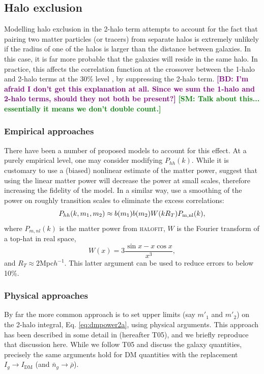 \documentclass[5p]{elsarticle}
\newcommand{\bd}[1]{\textcolor{purple}{\textbf{[BD: #1]}}}
\newcommand{\sgm}[1]{\textcolor{green}{\textbf{[SM: #1]}}}
\begin{document}
\subsection{Halo exclusion}
\label{sec:theory:exclusion}
Modelling halo exclusion in the 2-halo term attempts to account for the fact that pairing two matter particles (or tracers) from separate halos is extremely unlikely if the radius of one of the halos is larger than the distance between galaxies. 
In this case, it is far more probable that the galaxies will reside in the same halo. 
In practice, this affects the correlation function at the crossover between the 1-halo and 2-halo terms at the 30\% level \citep{Schneider2012}, by suppressing the 2-halo term. \bd{I'm afraid I don't get this explanation at all. Since we sum the 1-halo and 2-halo terms, should they not both be present?} \sgm{Talk about this... essentially it means we don't double count.}

\subsubsection{Empirical approaches}
There have been a number of proposed models to account for this effect. At a purely empirical level, one may consider modifying $P_{hh}(k)$. While it is customary to use a (biased) nonlinear estimate of the matter power, \citet{Cooray2002} suggest that using the linear matter power  will decrease the power at small scales, therefore increasing the fidelity of the model. In a similar way, \citet{Schneider2013} use a smoothing of the power on roughly transition scales to eliminate the excess correlations:
\begin{equation}
    P_{hh}(k,m_1,m_2) \approx b(m_1)b(m_2) W(kR_T) P_{\rm m, nl}(k),
\end{equation}
where $P_{m, nl}(k)$ is the matter power from \textsc{halofit}, $W$ is the Fourier transform of a top-hat in real space,
\begin{equation}
    W(x) = 3\frac{\sin x - x\cos x}{x^3},
\end{equation}
and $R_T\approx2 $Mpc$h^{-1}$.
This latter argument can be used to reduce errors to below 10\%.

\subsubsection{Physical approaches}
By far the more common approach is to set upper limits (say $m'_1$ and $m'_2$) on the 2-halo integral, Eq. \ref{eq:dmpower2a}, using physical arguments. This approach has been described in some detail in \citet{Tinker2005} (hereafter T05), 
and we briefly reproduce that discussion here. While we follow T05 and discuss the galaxy quantities, precisely the same arguments hold for DM quantities with the replacement $I_g \rightarrow I_\text{DM}$ (and $\bar{n}_g \rightarrow \bar{\rho}$). 
\end{document}
